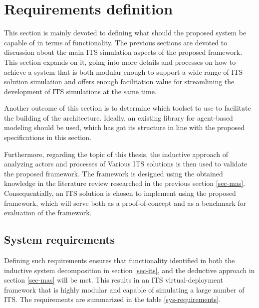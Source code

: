 \documentclass[0main.tex]{subfiles}
\begin{document}
\section{Requirements definition}\label{sec-requirements}

This section is mainly devoted to defining what should the proposed system be capable of in
terms of functionality. The previous sections are devoted to discussion about the main ITS
simulation aspects of the proposed framework. This section expands on it, going into more
details and processes on how to achieve a system that is both modular enough to support a wide
range of ITS solution simulation and offers enough facilitation value for streamlining the
development of ITS simulations at the same time. 

Another outcome of this section is to determine which toolset to use to facilitate the building of 
the architecture. Ideally, an existing library for agent-based modeling should be used, which has got 
its structure in line with the proposed specifications in this section.

Furthermore, regarding the topic of this thesis, the inductive approach of analyzing actors and
processes of Various ITS solutions is then used to validate the proposed framework. The
framework is designed using the obtained knowledge in the literature review researched in the
previous section \ref{sec-mas}. Consequentially, an ITS solution is chosen to implement
using the proposed framework, which will serve both as a proof-of-concept and as a benchmark
for evaluation of the framework.  

\subsection{System requirements}

Defining such requirements ensures that functionality identified in both the inductive system
decomposition in section \ref{sec-its}, and the deductive approach in section \ref{sec-mas}
will be met. This results in an ITS virtual-deployment framework that is highly modular and
capable of simulating a large number of ITS. The requirements are summarized in the table
\ref{sys-requirements}.
\end{document}
